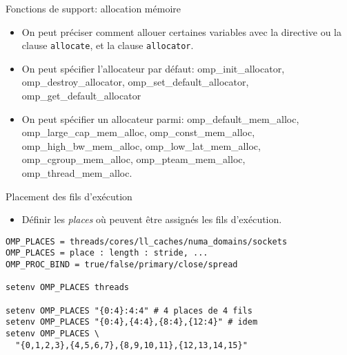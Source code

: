 \documentclass[10pt]{beamer}
\begin{document}
\begin{frame}[fragile]{Fonctions de support: allocation mémoire}

  \begin{itemize}
    \item On peut préciser comment allouer certaines variables avec la directive ou la clause \texttt{allocate}, et la clause \texttt{allocator}.

    \item On peut spécifier l'allocateur par défaut: omp\_init\_allocator, omp\_destroy\_allocator, omp\_set\_default\_allocator, omp\_get\_default\_allocator

    \item On peut spécifier un allocateur parmi: omp\_default\_mem\_alloc, omp\_large\_cap\_mem\_alloc, omp\_const\_mem\_alloc, omp\_high\_bw\_mem\_alloc, omp\_low\_lat\_mem\_alloc, omp\_cgroup\_mem\_alloc, omp\_pteam\_mem\_alloc, omp\_thread\_mem\_alloc.
  \end{itemize}
\end{frame}

\begin{frame}[fragile]{Placement des fils d'exécution}

  \begin{itemize}
    \item Définir les \textit{places} où peuvent être assignés les fils d'exécution.
  \end{itemize}
  
  \begin{verbatim}
OMP_PLACES = threads/cores/ll_caches/numa_domains/sockets
OMP_PLACES = place : length : stride, ...
OMP_PROC_BIND = true/false/primary/close/spread

setenv OMP_PLACES threads

setenv OMP_PLACES "{0:4}:4:4" # 4 places de 4 fils      
setenv OMP_PLACES "{0:4},{4:4},{8:4},{12:4}" # idem
setenv OMP_PLACES \
  "{0,1,2,3},{4,5,6,7},{8,9,10,11},{12,13,14,15}"
  \end{verbatim}
\end{frame}
\end{document}
